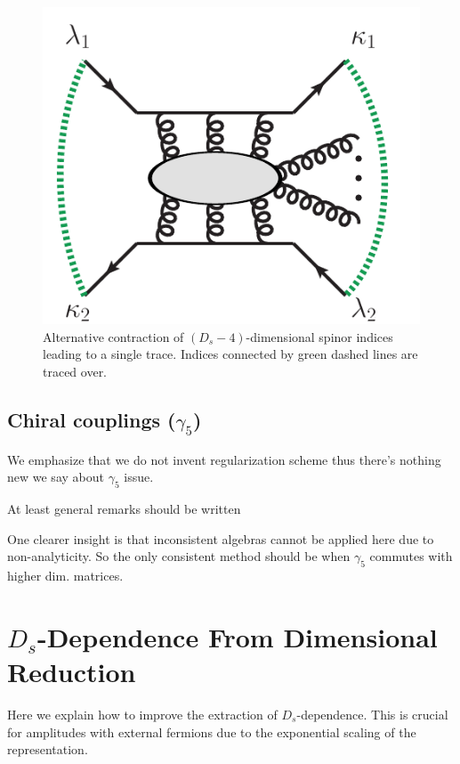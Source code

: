 \begin{figure}[]
  \begin{center}
  	\includegraphics[scale=0.5]
    {figures/singleTrace.pdf}
\end{center} 
\caption{Alternative contraction of $(D_s-4)$-dimensional spinor indices leading to a
single trace. Indices connected by green dashed lines are traced
over.}
\label{fig_SingleTrace}
\end{figure}





\subsection{Chiral couplings ($\gamma_5$)}


We emphasize that we do not invent regularization scheme thus there's nothing new we say about $\gamma_5$ issue.

At least general remarks should be written 

One clearer insight is that inconsistent algebras cannot be applied here due to non-analyticity.
So the only consistent method should be when $\gamma_5$ commutes with higher dim. matrices.


\section{$D_s$-Dependence From Dimensional Reduction}
Here we explain how to improve the extraction of $D_s$-dependence.
This is crucial for amplitudes with external fermions due to the exponential scaling of the representation.


